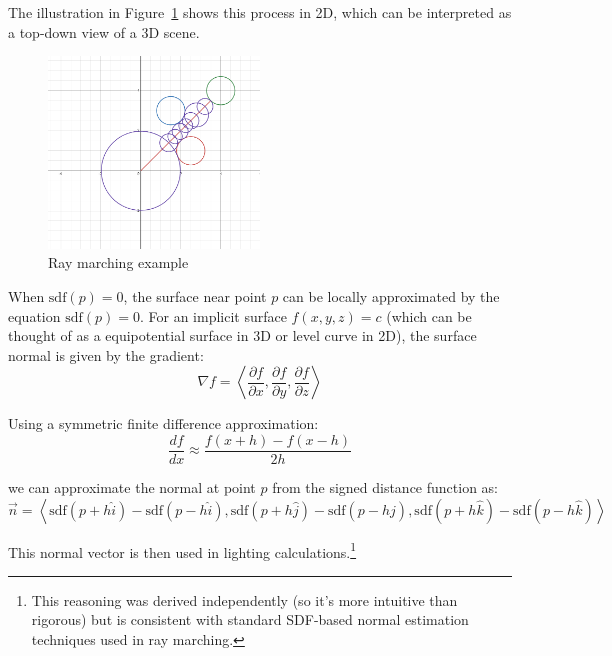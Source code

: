 The illustration in Figure~\ref{fig:raymarching_eg} shows this process in 2D, which can be interpreted as a top-down view of a 3D scene.

\begin{figure}[H]
    \centering
    \includegraphics[width=0.5\textwidth]{images/raymarching_eg.png}
    \caption{Ray marching example}
    \label{fig:raymarching_eg}
\end{figure}

When $\text{sdf}(p) = 0$, the surface near point $p$ can be locally approximated by the equation $\text{sdf}(p) = 0$. For an implicit surface $f(x, y, z) = c$ (which can be thought of as a equipotential surface in 3D or level curve in 2D), the surface normal is given by the gradient:
\[
\nabla f = \left\langle \frac{\partial f}{\partial x}, \frac{\partial f}{\partial y}, \frac{\partial f}{\partial z} \right\rangle
\]

Using a symmetric finite difference approximation:
\[
\frac{df}{dx} \approx \frac{f(x + h) - f(x - h)}{2h}
\]

we can approximate the normal at point $p$ from the signed distance function as:
\[
\vec{n} = \left\langle 
\text{sdf}(p + h\hat{i}) - \text{sdf}(p - h\hat{i}),
\text{sdf}(p + h\hat{j}) - \text{sdf}(p - h\hat{j}),
\text{sdf}(p + h\hat{k}) - \text{sdf}(p - h\hat{k})
\right\rangle
\]

This normal vector is then used in lighting calculations.\footnote{This reasoning was derived independently (so it's more intuitive than rigorous) but is consistent with standard SDF-based normal estimation techniques used in ray marching.}

